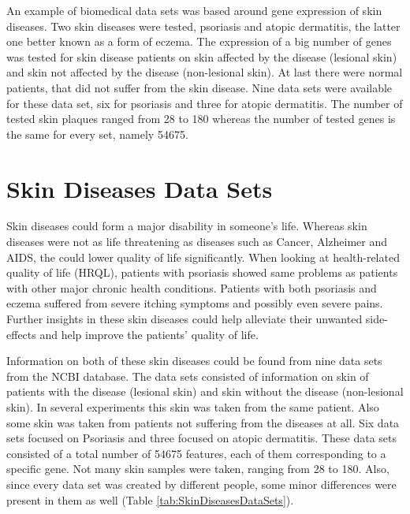 \documentclass[10pt,a4paper]{article}
\begin{document}
	An example of biomedical data sets was based around gene expression of skin diseases. Two skin diseases were tested, psoriasis and atopic dermatitis, the latter one better known as a form of eczema. The expression of a big number of genes was tested for skin disease patients on skin affected by the disease (lesional skin) and skin not affected by the disease (non-lesional skin). At last there were normal patients, that did not suffer from the skin disease. Nine data sets were available for these data set, six for psoriasis and three for atopic dermatitis. The number of tested skin plaques ranged from 28 to 180 whereas the number of tested genes is the same for every set, namely 54675.

	
	
	
	\section{Skin Diseases Data Sets}
	\label{sec:SkinDiseasesDataSet}
	
	Skin diseases could form a major disability in someone's life. Whereas skin diseases were not as life threatening as diseases such as Cancer, Alzheimer and AIDS, the could lower quality of life significantly. When looking at health-related quality of life (HRQL), patients with psoriasis showed same problems as patients with other major chronic health conditions.\cite{rapp1999psoriasis} Patients with both psoriasis and eczema suffered from severe itching symptoms and possibly even severe pains. Further insights in these skin diseases could help alleviate their unwanted side-effects and help improve the patients' quality of life.\cite{jowett1985skin}
	
	Information on both of these skin diseases could be found from nine data sets from the NCBI database\cite{edgar2002gene}. The data sets consisted of information on skin of patients with the disease (lesional skin) and skin without the disease (non-lesional skin). In several experiments this skin was taken from the same patient. Also some skin was taken from patients not suffering from the diseases at all. Six data sets focused on Psoriasis and three focused on atopic dermatitis. These data sets consisted of a total number of 54675 features, each of them corresponding to a specific gene. Not many skin samples were taken, ranging from 28 to 180. Also, since every data set was created by different people, some minor differences were present in them as well (Table \ref{tab:SkinDiseasesDataSets}).
	
\end{document}

